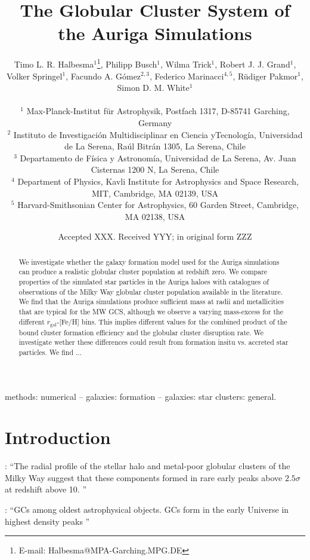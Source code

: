 \documentclass[a4paper,fleqn,usenatbib]{mnras}
\title[Auriga GCS]{The Globular Cluster System of the Auriga Simulations}
\author[T. L. R. Halbesma et al.]{\parbox[t]{\textwidth}{
    Timo L. R. Halbesma$^{1}$\thanks{E-mail: Halbesma@MPA-Garching.MPG.DE},
    Philipp Busch$^{1}$,
    Wilma Trick$^{1}$,
    Robert J. J. Grand$^{1}$, 
    Volker Springel$^{1}$, 
    Facundo A. G\'{o}mez$^{2,3}$, 
    Federico Marinacci$^{4,5}$,
    R\"{u}diger Pakmor$^{1}$, 
    Simon D. M. White$^{1}$
} \vspace{10pt} \\
$^{1}$ Max-Planck-Institut f\"ur Astrophysik, Postfach 1317, D-85741 Garching, Germany \\
$^{2}$ Instituto de Investigaci\'{o}n Multidisciplinar en Ciencia yTecnolog\'{i}a, 
    Universidad de La Serena, Ra\'{u}l Bitr\'{a}n 1305, La Serena, Chile \\
$^{3}$ Departamento de F\'{i}sica y Astronom\'{i}a, Universidad de La Serena, Av.
    Juan Cisternas 1200 N, La Serena, Chile \\
$^{4}$ Department of Physics, Kavli Institute for Astrophysics and Space Research,
    MIT, Cambridge, MA 02139, USA \\
$^{5}$ Harvard-Smithsonian Center for Astrophysics, 60 Garden Street, Cambridge,
    MA 02138, USA \\
}
\date{Accepted XXX. Received YYY; in original form ZZZ}
\begin{document}
\label{firstpage}
\pagerange{\pageref{firstpage}--\pageref{lastpage}}
\maketitle

\begin{abstract}
We investigate whether the galaxy formation model used for the Auriga simulations 
can produce a realistic globular cluster population at redshift zero. We compare
properties of the simulated star particles in the Auriga haloes with
catalogues of observations of the Milky Way globular cluster population available
in the literature. We find that the Auriga simulations produce sufficient mass
at radii and metallicities that are typical for the MW GCS, although we observe
a varying mass-excess for the different $r_{\text{gal}}$-[Fe/H] bins. This implies
different values for the combined product of the bound cluster formation efficiency
and the globular cluster disruption rate. We investigate wether these differences
could result from formation insitu vs. accreted star particles. We find ...
\end{abstract}

\begin{keywords}
methods: numerical -- galaxies: formation -- galaxies: star clusters: general.
\end{keywords}



\section{Introduction}

\citet{2005MNRAS.364..367D}: ``The radial profile of the stellar halo and metal-poor globular
clusters of the Milky Way suggest that these components formed in rare early peaks above $2.5 \sigma$ at redshift above 10. ''

\citet{2017MNRAS.465.3622R}: ``GCs among oldest astrophysical objects. GCs form in the early Universe in highest density peaks \citep[e.g.][]{2005MNRAS.364..367D, 2009ApJ...706L.192B}''
\end{document}
